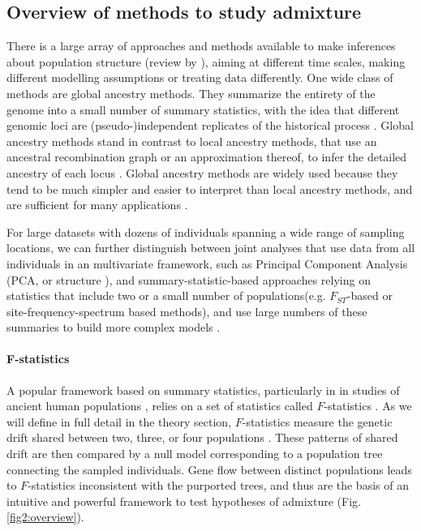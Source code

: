 \documentclass[12pt, letterpaper]{article}
\begin{document}
\subsection{Overview of methods to study admixture}
There is a large array of approaches and methods available to make inferences about population structure (review by  \cite{schraiber_methods_2015}), aiming at different time scales, making different modelling assumptions or treating data differently. 
One wide class of methods are global ancestry methods. They summarize the entirety of the genome into a small number of summary statistics, with the idea that different genomic loci are (pseudo-)independent replicates of the historical process \cite{pritchard_inference_2000, gopalan_scaling_2016, patterson_ancient_2012,alexander_fast_2009, tang_estimation_2005}. Global ancestry methods stand in contrast to local ancestry methods, that use an ancestral recombination graph or an approximation thereof, to infer the detailed ancestry of each locus  \cite{lawson_inference_2012, hellenthal_genetic_2014, speidel_method_2019, kelleher_efficient_2016}. Global ancestry methods are widely used because they tend to be much simpler and easier to interpret than local ancestry methods, and are sufficient for many applications \cite{pritchard_inference_2000, patterson_population_2006}.

For large datasets with dozens of individuals spanning a wide range of sampling locations, we can further distinguish between joint analyses that use data from all individuals in an multivariate framework, such as Principal Component Analysis (PCA, \cite{cavalli-sforza_analysis_1975, patterson_population_2006, novembre_genes_2008} or structure \cite{pritchard_inference_2000, alexander_fast_2009}), and summary-statistic-based approaches relying on statistics that include two or a small number of populations(e.g. $F_{ST}$-based or site-frequency-spectrum based methods), and use large numbers of these summaries to build more complex models \cite{excoffier_fastsimcoal_2011, kamm_efficiently_2020, gutenkunst_inferring_2009}. 

\paragraph{F-statistics}
A popular framework based on summary statistics, particularly in  in studies of ancient human populations \cite{orlando_ancient_2021}, relies on a set of statistics called $F$-statistics \cite{patterson_ancient_2012, peter_admixture_2016} . As we will define in full detail in the theory section, $F$-statistics measure the genetic drift shared between two, three, or four populations \cite{patterson_ancient_2012, peter_admixture_2016}.  These patterns of shared drift are then compared by a null model corresponding to a population tree connecting the sampled individuals. Gene flow between distinct populations leads to $F$-statistics inconsistent with the purported trees, and thus are the basis of an intuitive and powerful framework to test hypotheses of admixture (Fig. \ref{fig2:overview}). 
\end{document}
